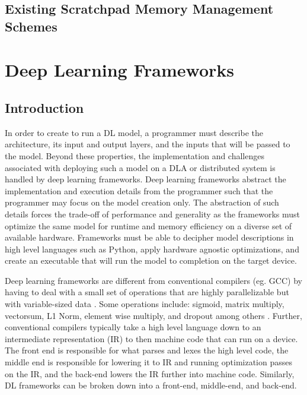 \subsection{Existing Scratchpad Memory Management Schemes}

\section{Deep Learning Frameworks}
\subsection{Introduction}
In order to create to run a DL model, a programmer must describe the architecture, its input and output layers, and the inputs that will be passed to the model. Beyond these
properties, the implementation and challenges associated with deploying such a model
on a DLA or distributed system is handled by deep learning frameworks. Deep learning
frameworks abstract the implementation and execution details from the programmer such
that the programmer may focus on the model creation only. The abstraction of such
details forces the trade-off of performance and generality as the frameworks
must optimize the same model for runtime and memory efficiency on a diverse set
of available hardware. Frameworks must be able to decipher model descriptions
in high level languages such as Python, apply hardware agnostic optimizations,
and create an executable that will run the model to completion on the target
device.

Deep learning frameworks are different from conventional compilers (eg. GCC) by
having to deal with a small set of operations that are highly parallelizable
but with variable-sized data \cite{nGraph}. Some operations include: sigmoid,
matrix multiply, vectorsum, L1 Norm, element wise multiply, and dropout among
others \cite{cntk}. Further, conventional compilers typically take a high level
language down to an intermediate representation (IR) to then machine code that
can run on a device.  The front end is responsible for what parses and lexes
the high level code, the middle end is responsible for lowering it to IR and
running optimization passes on the IR, and the back-end lowers the IR further
into machine code. Similarly, DL frameworks can be broken down into a
front-end, middle-end, and back-end.

